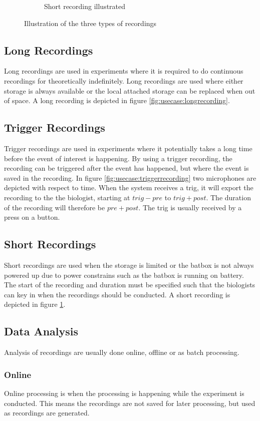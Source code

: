 \begin{figure}
\begin{subfigure}[b]{0.3\textwidth}
        \caption{Short recording illustrated}
        \label{fig:usecase:shortrecording}
    \end{subfigure}
    \caption{Illustration of the three types of recordings}\label{fig:usecase:recordingtypes}
\end{figure}
\subsection{Long Recordings}
Long recordings are used in experiments where it is required to do continuous recordings for theoretically indefinitely. Long recordings are used where either storage is always available or the local attached storage can be replaced when out of space. A long recording is depicted in figure \ref{fig:usecase:longrecording}.

\subsection{Trigger Recordings} 
Trigger recordings are used in experiments where it potentially takes a long time before the event of interest is happening. By using a trigger recording, the recording can be triggered after the event has happened, but where the event is saved in the recording. In figure \ref{fig:usecase:triggerrecording} two microphones are depicted with respect to time. When the system receives a trig, it will export the recording to the the biologist, starting at $trig-pre$ to $trig+post$. The duration of the recording will therefore be $pre+post$. The trig is usually received by a press on a button.

\subsection{Short Recordings}
Short recordings are used when the storage is limited or the batbox is not always powered up due to power constrains such as the batbox is running on battery. The start of the recording and duration must be specified such that the biologists can key in when the recordings should be conducted.
A short recording is depicted in figure \ref{fig:usecase:shortrecording}.

\subsection{Data Analysis}
Analysis of recordings are usually done online, offline or as batch processing.
\subsubsection{Online}\label{sec:usecase:online}
Online processing is when the processing is happening while the experiment is conducted. This means the recordings are not saved for later processing, but used as recordings are generated.


